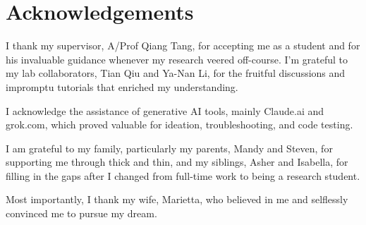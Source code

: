 \chapter*{Acknowledgements}
I thank my supervisor, A/Prof Qiang Tang, for accepting me as a student and for his invaluable guidance whenever my research veered off-course. I'm grateful to my lab collaborators, Tian Qiu and Ya-Nan Li, for the fruitful discussions and impromptu tutorials that enriched my understanding.

I acknowledge the assistance of generative AI tools, mainly Claude.ai and grok.com, which proved valuable for ideation, troubleshooting, and code testing.

I am grateful to my family, particularly my parents, Mandy and Steven, for supporting me through thick and thin, and my siblings, Asher and Isabella, for filling in the gaps after I changed from full-time work to being a research student.

Most importantly, I thank my wife, Marietta, who believed in me and selflessly convinced me to pursue my dream.